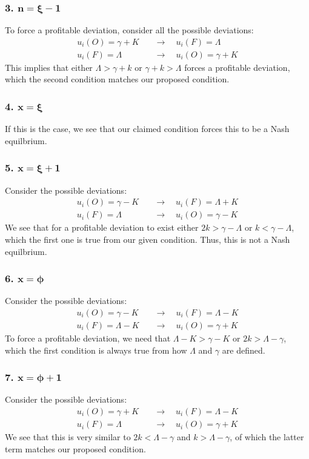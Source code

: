 \documentclass[12pt]{article}
\begin{document}
\subsubsection*{3. $\mathbf{n = \xi - 1}$} 
To force a profitable deviation, 
consider all the possible deviations:
\begin{align*}
    u_i(O) = \gamma + K \quad &\to \quad u_i(F) = \Lambda \\
    u_i(F) = \Lambda \quad &\to \quad u_i(O) = \gamma + K
\end{align*}
This implies that either $\Lambda > \gamma + k$ or $\gamma + k > \Lambda$ forces a profitable deviation, which the second condition matches our proposed condition. 
\subsubsection*{4. $\mathbf{x = \xi}$}
If this is the case, we see that our claimed condition forces this to be a Nash equilbrium. 
\subsubsection*{5. $\mathbf{x = \xi + 1}$}
Consider the possible deviations:
\begin{align*}
    u_i(O) = \gamma - K \quad &\to \quad u_i(F) = \Lambda + K \\
    u_i(F) = \Lambda \quad &\to \quad u_i(O) = \gamma - K
\end{align*}
We see that for a profitable deviation to exist either $2k > \gamma - \Lambda$ or $k < \gamma - \Lambda$, which the first one is true from our given condition. Thus, this is not a Nash equilbrium. 
\subsubsection*{6. $\mathbf{x = \phi}$}
Consider the possible deviations:
\begin{align*}
    u_i(O) = \gamma - K \quad &\to \quad u_i(F) = \Lambda - K \\
    u_i(F) = \Lambda - K\quad &\to \quad u_i(O) = \gamma + K
\end{align*}
To force a profitable deviation, we need that $\Lambda - K > \gamma - K$ or $2k > \Lambda - \gamma$, which the first condition is always true from how $\Lambda$ and $\gamma$ are defined. 
\subsubsection*{7. $\mathbf{x = \phi + 1}$}
Consider the possible deviations:
\begin{align*}
    u_i(O) = \gamma + K \quad &\to \quad u_i(F) = \Lambda - K \\
    u_i(F) = \Lambda \quad &\to \quad u_i(O) = \gamma + K
\end{align*}
We see that this is very similar to $2k < \Lambda - \gamma$ and $k > \Lambda - \gamma$, of which the latter term matches our proposed condition. 
\end{document}
